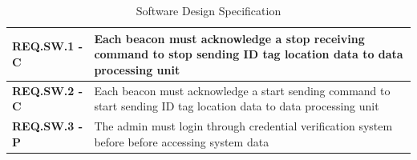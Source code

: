 \medskip
\bgroup
\def\arraystretch{1.5}
\begin{table}[H]
\centering
\begin{tabular}{ | m{3cm} | m{12.5cm} |}
\hline
\textbf{REQ.SW.1 - C} &  Each beacon must acknowledge a stop receiving command to stop sending ID tag location data to data processing unit \\
\hline
\textbf{REQ.SW.2 - C} &  Each beacon must acknowledge a start sending command to start sending ID tag location data to data processing unit  \\
\hline
\textbf{REQ.SW.3 - P} &  The admin must login through credential verification system before before accessing system data \\
\hline
\end{tabular}
\caption{Software Design Specification}
\end{table}

